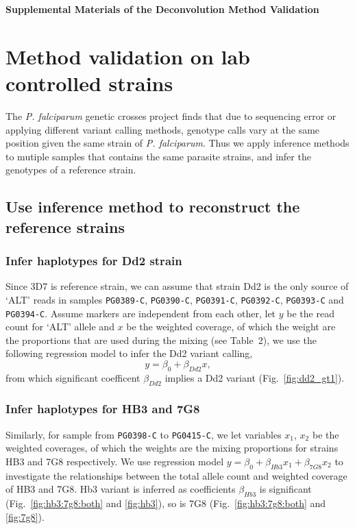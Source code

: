 

\begin{center}
\textbf{\large Supplemental Materials of the Deconvolution Method Validation}
\end{center}

\section{Method validation on lab controlled strains} \label{sup:sec:validate}

The {\em P. falciparum} genetic crosses project \citep{Miles2015:sup} finds that due to sequencing error or applying different variant calling methods, genotype calls vary at the same position given the same strain of {\em P. falciparum}. Thus we apply inference methods to mutiple samples that contains the same parasite strains, and infer the genotypes of a reference strain.


\subsection{Use inference method to reconstruct the reference strains}
\subsubsection{Infer haplotypes for Dd2 strain}
Since 3D7 is reference strain, we can assume that strain Dd2 is the only source of `ALT' reads in samples {\tt PG0389-C}, {\tt PG0390-C}, {\tt PG0391-C}, {\tt PG0392-C}, {\tt PG0393-C} and {\tt PG0394-C}. Assume markers are independent from each other, let $y$ be the read count for `ALT' allele and $x$ be the weighted coverage, of which the weight are the proportions that are used during the mixing (see Table~2), we use the following regression model to infer the Dd2 variant calling, $$y = \beta_0 + \beta_{Dd2} x,$$
from which significant coefficent $\beta_{Dd2}$ implies a Dd2 variant (Fig.~\ref{fig:dd2_gt1}).

\subsubsection{Infer haplotypes for HB3 and 7G8}
Similarly, for sample from {\tt PG0398-C} to {\tt PG0415-C},  we let variables $x_1$, $x_2$ be the weighted coverages, of which the weights are the mixing proportions for strains HB3 and 7G8 respectively. We use regression model $y = \beta_0 + \beta_{Hb3} x_1 + \beta_{7G8} x_2$ to investigate the relationships between the total allele count and weighted coverage of HB3 and 7G8. Hb3 variant is inferred as coefficients $\beta_{Hb3}$ is significant (Fig.~\ref{fig:hb3:7g8:both} and \ref{fig:hb3}), so is 7G8 (Fig.~\ref{fig:hb3:7g8:both} and \ref{fig:7g8}).



